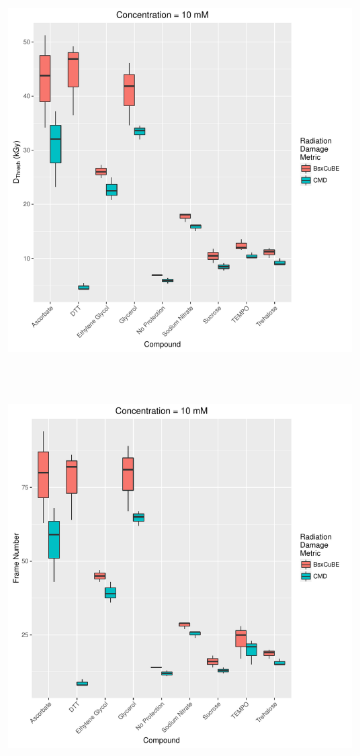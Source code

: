     \\
\begin{figure}
    \ContinuedFloat
    \centering
    \begin{subfigure}[b]{0.7\textwidth}
            \centering
            \includegraphics[width=\textwidth]{figures/saxs/Conc_10_dose.pdf}
            \caption{}
            \label{fig:SAXS dose- 10mM}
    \end{subfigure}
    \\
    \begin{subfigure}[b]{0.7\textwidth}
            \centering
            \includegraphics[width=\textwidth]{figures/saxs/Conc_10_frame_num.pdf}

\end{subfigure}
\end{figure}

